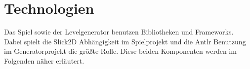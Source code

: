 \section{Technologien}

Das Spiel sowie der Levelgenerator benutzen Bibliotheken und Frameworks. Dabei spielt die Slick2D Abhängigkeit im Spielprojekt und die Antlr Benutzung im Generatorprojekt die größte Rolle. Diese beiden Komponenten werden im Folgenden näher erläutert.



